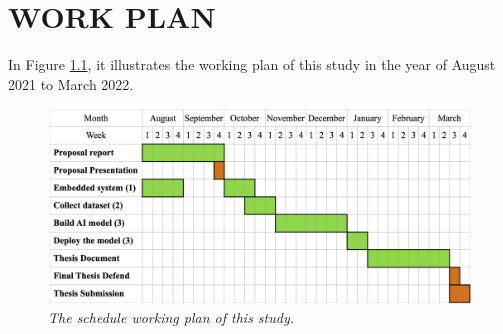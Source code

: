 \setlength{\parindent}{0in} 
\setlength{\parskip}{1em}
\setlength{\baselineskip}{1.6em}

\chapter{WORK PLAN}
\label{ch:conclusion}

In Figure \ref{fig:timetable}, it illustrates the working plan of this study in the year of August 2021 to March 2022.

\begin{figure}[H]
  \centering
  \caption[The schedule working plan of this study]{\emph{The schedule working plan of this study.}}\label{fig:timetable}
  \includegraphics[scale = 0.13]{figures/timetable.jpg}
  \end{figure}

\FloatBarrier
